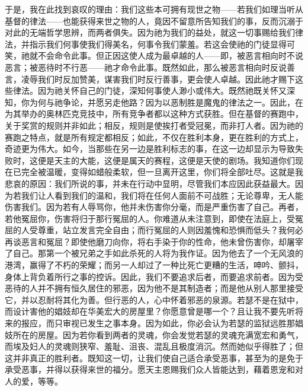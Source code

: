 于是，我在此找到哀叹的理由：我们这些本可拥有现世之物——若我们如理当听从基督的律法——也能获得来世之物的人，竟因不留意所告知我们的事，反而沉溺于对此的无端哲学思辨，而两者俱失。因为祂为我们的益处，就这一切事赐给我们律法，并指示我们何事使我们得美名，何事令我们蒙羞。若这会使祂的门徒显得可笑，祂就不会命令此事。但正因这使人成为最卓越的人——即，被恶言相向时不说恶言；被恶待时不行恶——祂才命令此事。既然如此，那么被恶言相向时反说善言，凌辱我们时反加赞美，谋害我们时反行善事，更会使人卓越。因此祂才赐下这些律法。因为祂关怀自己的门徒，深知何事使人渺小或伟大。既然祂既关怀又深知，你为何与祂争论，并愿另走他路？因为以恶制胜是魔鬼的律法之一。因此，在为其举办的奥林匹克竞技中，所有竞争者都以这种方式获胜。但在基督的赛跑中，关于奖赏的规则并非如此；相反，规则是使挨打者受冠冕，而非打人者。因为祂的赛跑之特点，就是所有规定都相反；如此，不仅在胜利本身，更在胜利的方式上，奇迹更为伟大。如今，当那些在另一边是胜利标志的事，在这一边却显示为导致失败时，这便是天主的大能，这便是属天的赛程，这便是天使的剧场。我知道你们现在已完全被温暖，变得如蜡般柔软，但一旦离开这里，你们将全部吐尽。这就是我悲哀的原因：我们所说的事，并未在行动中显明，尽管我们本应因此获益最大。因为若我们让人看到我们的温和，我们将在任何人面前不可战胜；无论尊卑，无人能伤害我们。因为若有人辱骂你，他并未伤害你分毫，而是严重伤害了自己。再者，若他冤屈你，伤害将归于那行冤屈的人。你难道从未注意到，即使在法庭上，受冤屈的人受尊重，站立发言完全自由；而行冤屈的人则因羞愧和恐惧而低头？我何必再谈恶言和冤屈？即使他磨刀向你，将右手染于你的性命，他未曾伤害你，却屠宰了自己。那第一个被兄弟之手如此杀死的人将为我作证。因为他去了一个无风浪的港湾，赢得了不朽的荣耀；而另一人却过了一种比死亡更糟的生活，呻吟、颤抖，身体上背负着所行之事的控诉。因此，我们不要追求后者，而要追求前者。因为受恶待的人并不拥有恒久居住的邪恶，因为他不是其制造者；而是他从别人那里接受它，并以忍耐将其化为善。但行恶的人，心中怀着邪恶的泉源。若瑟不是在狱中，而设计害他的娼妓却在华美宏大的房屋里？你愿意曾是哪一个？且让我不要先听将来的报应，而只审视已发生之事本身。因为如此，你必会认为若瑟的监狱远胜那娼妓所在的房屋。因为若你看到两者的灵魂，你会发觉若瑟的灵魂充满宽宏和勇气，而埃及妇人的灵魂则狭窄、羞耻、沮丧、混乱且极度消沉。然而她似乎得胜了；但这并非真正的胜利者。既知这一切，让我们使自己适合承受恶事，甚至为的是免于承受恶事，并得以获得来世的福分。愿天主恩赐我们众人皆能达到，藉着恩宠和对人的爱，等等。\par



